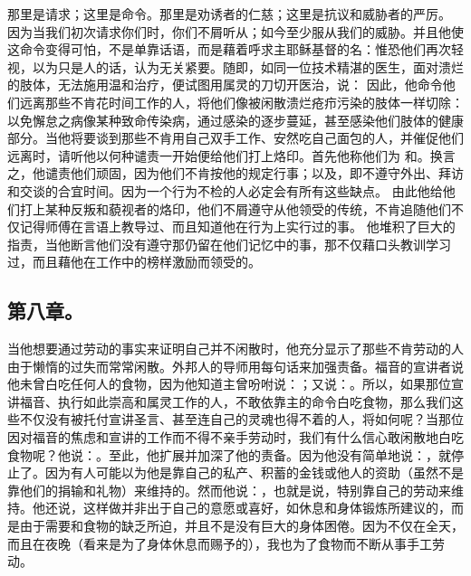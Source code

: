 那里是请求；这里是命令。那里是劝诱者的仁慈；这里是抗议和威胁者的严厉。 因为当我们初次请求你们时，你们不屑听从；如今至少服从我们的威胁。并且他使这命令变得可怕，不是单靠话语，而是藉着呼求主耶稣基督的名：惟恐他们再次轻视，以为只是人的话，认为无关紧要。随即，如同一位技术精湛的医生，面对溃烂的肢体，无法施用温和治疗，便试图用属灵的刀切开医治，说： 因此，他命令他们远离那些不肯花时间工作的人，将他们像被闲散溃烂疮疖污染的肢体一样切除：以免懈怠之病像某种致命传染病，通过感染的逐步蔓延，甚至感染他们肢体的健康部分。当他将要谈到那些不肯用自己双手工作、安然吃自己面包的人，并催促他们远离时，请听他以何种谴责一开始便给他们打上烙印。首先他称他们为 和。换言之，他谴责他们顽固，因为他们不肯按他的规定行事；以及，即不遵守外出、拜访和交谈的合宜时间。因为一个行为不检的人必定会有所有这些缺点。 由此他给他们打上某种反叛和藐视者的烙印，他们不屑遵守从他领受的传统，不肯追随他们不仅记得师傅在言语上教导过、而且知道他在行为上实行过的事。 他堆积了巨大的指责，当他断言他们没有遵守那仍留在他们记忆中的事，那不仅藉口头教训学习过，而且藉他在工作中的榜样激励而领受的。\par


\subsection{第八章。}

\par

当他想要通过劳动的事实来证明自己并不闲散时，他充分显示了那些不肯劳动的人由于懒惰的过失而常常闲散。外邦人的导师用每句话来加强责备。福音的宣讲者说他未曾白吃任何人的食物，因为他知道主曾吩咐说：；又说：。所以，如果那位宣讲福音、执行如此崇高和属灵工作的人，不敢依靠主的命令白吃食物，那么我们这些不仅没有被托付宣讲圣言、甚至连自己的灵魂也得不着的人，将如何呢？当那位因对福音的焦虑和宣讲的工作而不得不亲手劳动时，我们有什么信心敢闲散地白吃食物呢？他说：。至此，他扩展并加深了他的责备。因为他没有简单地说：，就停止了。因为有人可能以为他是靠自己的私产、积蓄的金钱或他人的资助（虽然不是靠他们的捐输和礼物）来维持的。然而他说：，也就是说，特别靠自己的劳动来维持。他还说，这样做并非出于自己的意愿或喜好，如休息和身体锻炼所建议的，而是由于需要和食物的缺乏所迫，并且不是没有巨大的身体困倦。因为不仅在全天，而且在夜晚（看来是为了身体休息而赐予的），我也为了食物而不断从事手工劳动。\par

